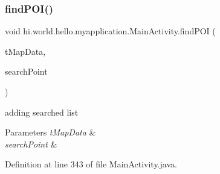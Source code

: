 \subsubsection{\texorpdfstring{findPOI()}{findPOI()}}
{\footnotesize\ttfamily void hi.\+world.\+hello.\+myapplication.\+Main\+Activity.\+find\+P\+OI (\begin{DoxyParamCaption}\item[{T\+Map\+Data}]{t\+Map\+Data,  }\item[{String}]{search\+Point }\end{DoxyParamCaption})\hspace{0.3cm}{\ttfamily [private]}}



adding searched list 


\begin{DoxyParams}{Parameters}
{\em t\+Map\+Data} & \\
\hline
{\em search\+Point} & \\
\hline
\end{DoxyParams}


Definition at line 343 of file Main\+Activity.\+java.


